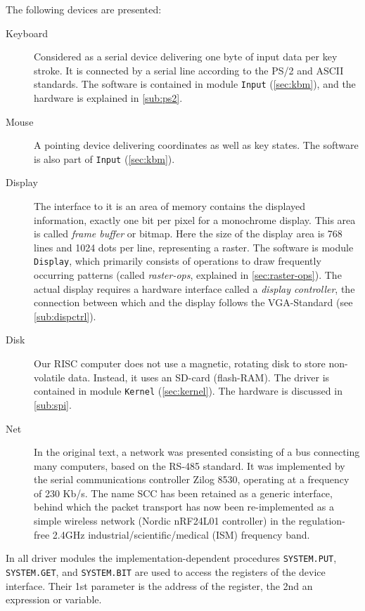 The following devices are presented:
\begin{description}
  \item[Keyboard] Considered as a serial device delivering one byte of input data per key
    stroke. It is connected by a serial line according to the PS/2 and ASCII standards.
    The software is contained in module \verb|Input| (\ref{sec:kbm}), and the hardware is
    explained in \ref{sub:ps2}.
  \item[Mouse] A pointing device delivering coordinates as well as key states. The software
    is also part of \verb|Input| (\ref{sec:kbm}).
  \item[Display] The interface to it is an area of memory contains the displayed information,
    exactly one bit per pixel for a monochrome display. This area is called \emph{frame buffer}
    or bitmap. Here the size of the display area is 768 lines and 1024 dots per line,
    representing a raster. The software is module \verb|Display|, which primarily consists
    of operations to draw frequently occurring patterns (called \emph{raster-ops}, explained
    in \ref{sec:raster-ops}). The actual display requires a hardware interface called a
    \emph{display controller}, the connection between which and the display follows the
    VGA-Standard (see \ref{sub:dispctrl}).
  \item[Disk] Our RISC computer does not use a magnetic, rotating disk to store non-volatile
    data. Instead, it uses an SD-card (flash-RAM). The driver is contained in module
    \verb|Kernel| (\ref{sec:kernel}). The hardware is discussed in \ref{sub:spi}.
  \item[Net] In the original text, a network was presented consisting of a bus connecting
    many computers, based on the RS-485 standard. It was implemented by the serial communications
    controller Zilog 8530, operating at a frequency of 230 Kb/s. The name SCC has been retained
    as a generic interface, behind which the packet transport has now been re-implemented
    as a simple wireless network (Nordic nRF24L01 controller) in the regulation-free 2.4GHz
    industrial/scientific/medical (ISM) frequency band.
\end{description}
In all driver modules the implementation-dependent procedures \verb|SYSTEM.PUT|, \verb|SYSTEM.GET|,
and \verb|SYSTEM.BIT| are used to access the registers of the device interface. Their 1st
parameter is the address of the register, the 2nd an expression or variable.


